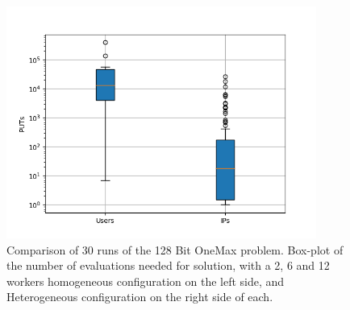 \documentclass{llncs}
\begin{document}
\begin{figure}[t]
    \centering
        \includegraphics[width=4in]{img/puts_box.png}
    \caption{Comparison of 30 runs of the 128 Bit OneMax problem. 
    Box-plot of the number of evaluations needed for solution, with a 2, 6 and 12 workers
    homogeneous configuration on the left side, and Heterogeneous configuration on the
    right side of each.
    }
    \label{fig:comp-onemax}
\end{figure}
\end{document}
